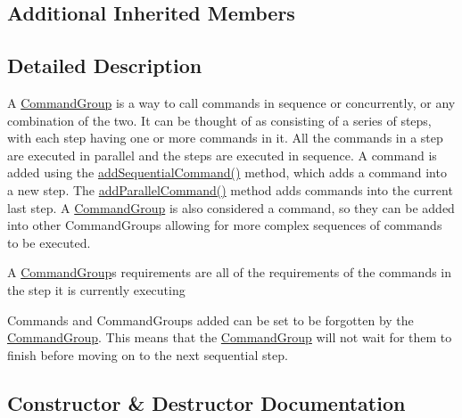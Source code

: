 \subsection*{Additional Inherited Members}


\subsection{Detailed Description}
A \mbox{\hyperlink{classlib_iterative_robot_1_1_command_group}{Command\+Group}} is a way to call commands in sequence or concurrently, or any combination of the two. It can be thought of as consisting of a series of steps, with each step having one or more commands in it. All the commands in a step are executed in parallel and the steps are executed in sequence. A command is added using the \mbox{\hyperlink{classlib_iterative_robot_1_1_command_group_a7e3167a89a45e6b1fc5df9a18c2946b7}{add\+Sequential\+Command()}} method, which adds a command into a new step. The \mbox{\hyperlink{classlib_iterative_robot_1_1_command_group_a7255a0b640e74ce74870939b45d23a58}{add\+Parallel\+Command()}} method adds commands into the current last step. A \mbox{\hyperlink{classlib_iterative_robot_1_1_command_group}{Command\+Group}} is also considered a command, so they can be added into other Command\+Groups allowing for more complex sequences of commands to be executed.

A \mbox{\hyperlink{classlib_iterative_robot_1_1_command_group}{Command\+Group}}\textquotesingle{}s requirements are all of the requirements of the commands in the step it is currently executing

Commands and Command\+Groups added can be set to be \textquotesingle{}forgotten\textquotesingle{} by the \mbox{\hyperlink{classlib_iterative_robot_1_1_command_group}{Command\+Group}}. This means that the \mbox{\hyperlink{classlib_iterative_robot_1_1_command_group}{Command\+Group}} will not wait for them to finish before moving on to the next sequential step. 

\subsection{Constructor \& Destructor Documentation}
\mbox{\label{classlib_iterative_robot_1_1_command_group_a862143e691209986739c234cb0fc4cc8}} 
